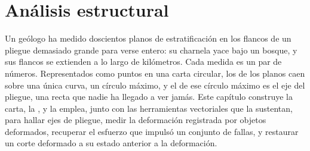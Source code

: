 \chapter{Análisis estructural}\label{ch:b3:structural-analysis}

Un geólogo ha medido doscientos planos de estratificación en los flancos de un pliegue
demasiado grande para verse entero: su charnela yace bajo un bosque, y sus flancos se extienden a lo largo de
kilómetros. Cada medida es un par de números. Representados como puntos en una carta circular,
los  de los planos caen sobre una única curva, un círculo máximo, y
el  de ese círculo máximo es el eje del pliegue, una recta que nadie ha
llegado a ver jamás. Este capítulo construye la carta, la , y
la emplea, junto con las herramientas vectoriales que la sustentan, para hallar ejes de pliegue, medir la
deformación registrada por objetos deformados, recuperar el esfuerzo que impulsó un conjunto de
fallas, y restaurar un corte deformado a su estado anterior a la
deformación.

